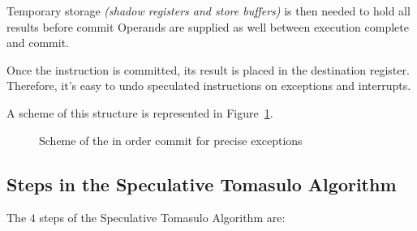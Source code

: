 \documentclass[english]{article}
\begin{document}
Temporary storage \textit{(shadow registers and store buffers)} is then needed to hold all results before commit
Operands are supplied as well between execution complete and commit.

Once the instruction is committed, its result is placed in the destination register.
Therefore, it's easy to undo speculated instructions on exceptions and interrupts.

A scheme of this structure is represented in Figure~\ref{fig:exceptions-in-order-commit}.

\begin{figure}[htbp]
  \bigskip
  \centering
  \caption{Scheme of the in order commit for precise exceptions}
  \label{fig:exceptions-in-order-commit}
  \bigskip
\end{figure}

\subsection{Steps in the Speculative Tomasulo Algorithm}

The \(4\) steps of the Speculative Tomasulo Algorithm are:
\end{document}
